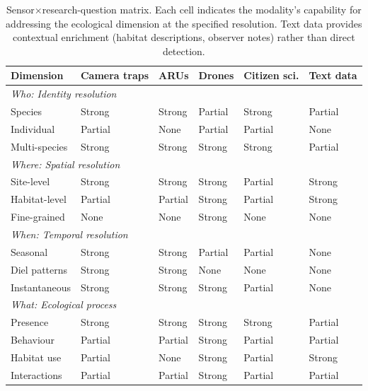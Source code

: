 \documentclass[12pt]{article}
\begin{document}
{\begin{table}[h]
\centering
\small
\begin{tabular}{p{2cm} p{2cm} p{2cm} p{2cm} p{2cm} p{2cm}}
\toprule
\textbf{Dimension} & \textbf{Camera traps} & \textbf{ARUs} & \textbf{Drones} & \textbf{Citizen sci.} & \textbf{Text data} \\
\midrule
\multicolumn{6}{l}{\textit{Who: Identity resolution}} \\
\quad Species & Strong & Strong & Partial & Strong & Partial \\
\quad Individual & Partial & None & Partial & Partial & None \\
\quad Multi-species & Strong & Strong & Strong & Strong & Partial \\
\midrule
\multicolumn{6}{l}{\textit{Where: Spatial resolution}} \\
\quad Site-level & Strong & Strong & Strong & Partial & Strong \\
\quad Habitat-level & Partial & Partial & Strong & Partial & Strong \\
\quad Fine-grained & None & None & Strong & None & None \\
\midrule
\multicolumn{6}{l}{\textit{When: Temporal resolution}} \\
\quad Seasonal & Strong & Strong & Partial & Partial & None \\
\quad Diel patterns & Strong & Strong & None & None & None \\
\quad Instantaneous & Strong & Strong & Strong & Partial & None \\
\midrule
\multicolumn{6}{l}{\textit{What: Ecological process}} \\
\quad Presence & Strong & Strong & Strong & Strong & Partial \\
\quad Behaviour & Partial & Partial & Strong & Partial & Partial \\
\quad Habitat use & Partial & None & Strong & Partial & Strong \\
\quad Interactions & Partial & Partial & Strong & Partial & Partial \\
\bottomrule
\end{tabular}
\caption{Sensor$\times$research-question matrix. Each cell indicates the modality's capability for addressing the ecological dimension at the specified resolution. Text data provides contextual enrichment (habitat descriptions, observer notes) rather than direct detection.}
\label{table:sensor_matrix}
\end{table}

}
\end{document}
